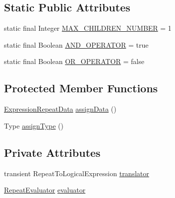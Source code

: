 \subsection*{Static Public Attributes}
\begin{DoxyCompactItemize}
\item 
static final Integer \hyperlink{classit_1_1emarolab_1_1cagg_1_1core_1_1language_1_1syntax_1_1expressionTree_1_1expressionNodeType_1_1RepeatExpressionNode_af4a12cc253b3d81324fdb50b99a69e86}{M\-A\-X\-\_\-\-C\-H\-I\-L\-D\-R\-E\-N\-\_\-\-N\-U\-M\-B\-E\-R} = 1
\item 
static final Boolean \hyperlink{classit_1_1emarolab_1_1cagg_1_1core_1_1language_1_1syntax_1_1expressionTree_1_1expressionNodeType_1_1RepeatExpressionNode_a9c080850161e0694721c729aca9c4a54}{A\-N\-D\-\_\-\-O\-P\-E\-R\-A\-T\-O\-R} = true
\item 
static final Boolean \hyperlink{classit_1_1emarolab_1_1cagg_1_1core_1_1language_1_1syntax_1_1expressionTree_1_1expressionNodeType_1_1RepeatExpressionNode_a3eae2bc5b3d1011f34db0f8db367ac0a}{O\-R\-\_\-\-O\-P\-E\-R\-A\-T\-O\-R} = false
\end{DoxyCompactItemize}
\subsection*{Protected Member Functions}
\begin{DoxyCompactItemize}
\item 
\hyperlink{classit_1_1emarolab_1_1cagg_1_1core_1_1language_1_1syntax_1_1expressionTree_1_1ExpressionDataFactory_1_1ExpressionRepeatData}{Expression\-Repeat\-Data} \hyperlink{classit_1_1emarolab_1_1cagg_1_1core_1_1language_1_1syntax_1_1expressionTree_1_1expressionNodeType_1_1RepeatExpressionNode_ac6c3e514a9fc1d963fcf982be226a16f}{assign\-Data} ()
\item 
Type \hyperlink{classit_1_1emarolab_1_1cagg_1_1core_1_1language_1_1syntax_1_1expressionTree_1_1expressionNodeType_1_1RepeatExpressionNode_a4f06f1706e5c0de29c5f0c579f656a05}{assign\-Type} ()
\end{DoxyCompactItemize}
\subsection*{Private Attributes}
\begin{DoxyCompactItemize}
\item 
transient Repeat\-To\-Logical\-Expression \hyperlink{classit_1_1emarolab_1_1cagg_1_1core_1_1language_1_1syntax_1_1expressionTree_1_1expressionNodeType_1_1RepeatExpressionNode_ab5fb4e475bd09b572d920458ba2dc7a8}{translator}
\item 
\hyperlink{classit_1_1emarolab_1_1cagg_1_1core_1_1language_1_1syntax_1_1expressionTree_1_1expressionNodeTyp785488d13bbbabc8bec5d8852bfc23de}{Repeat\-Evaluator} \hyperlink{classit_1_1emarolab_1_1cagg_1_1core_1_1language_1_1syntax_1_1expressionTree_1_1expressionNodeType_1_1RepeatExpressionNode_a37caf8de00e3deb22f0c496d49e17e1e}{evaluator}
\end{DoxyCompactItemize}


